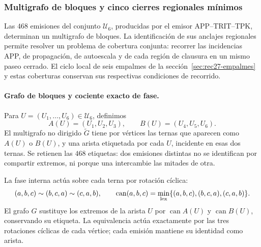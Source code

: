 \subsubsection{Multigrafo de bloques y cinco cierres regionales mínimos}
\label{regcl27:seccion}

Las \(468\) emisiones del conjunto \(\mathcal U_6\), producidas por
el emisor APP--TRIT--TPK, determinan un multigrafo de bloques. La
identificación de sus anclajes regionales permite resolver un problema
de cobertura conjunta: recorrer las incidencias APP, de propagación,
de autoescala y de cada región de clausura en un mismo paseo cerrado.
El ciclo local de seis empalmes de la sección~\ref{sec:rec27-empalmes}
y estas coberturas conservan sus respectivas condiciones de recorrido.

\paragraph{Grafo de bloques y cociente exacto de fase.}
Para \(U=(U_1,\ldots,U_6)\in\mathcal U_6\), definimos
\begin{equation}
 A(U)=(U_1,U_2,U_3),\qquad B(U)=(U_4,U_5,U_6).
 \label{regcl27:mitades}
\end{equation}
El multigrafo no dirigido \(\widetilde G\) tiene por vértices las ternas
que aparecen como \(A(U)\) o \(B(U)\), y una arista etiquetada por cada
\(U\), incidente en esas dos ternas. Se retienen las \(468\) etiquetas:
dos emisiones distintas no se identifican por compartir extremos, ni
porque una intercambie las mitades de otra.

La fase interna actúa sobre cada terna por rotación cíclica:
\begin{equation}
 (a,b,c)\sim(b,c,a)\sim(c,a,b),\qquad
 \operatorname{can}(a,b,c)
 =\min_{\rm lex}\{(a,b,c),(b,c,a),(c,a,b)\}.
 \label{regcl27:fase}
\end{equation}
El grafo \(G\) sustituye los extremos de la arista \(U\) por
\(\operatorname{can}A(U)\) y \(\operatorname{can}B(U)\), conservando
su etiqueta. La equivalencia actúa exactamente por las tres rotaciones
cíclicas de cada vértice; cada emisión mantiene su identidad como arista.

